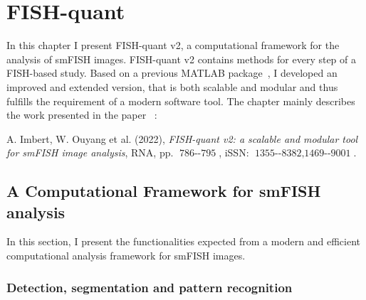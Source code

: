
\graphicspath{{./figures/chapter1/}}

\chapter{FISH-quant}
\label{ch:chapter1}

\minitoc
\newpage

In this chapter I present FISH-quant v2, a computational framework for the analysis of \ac{smFISH} images.
FISH-quant v2 contains methods for every step of a \ac{FISH}-based study.
Based on a previous MATLAB package~\cite{mueller_fish-quant_2013}, I developed an improved and extended version, that is both scalable and modular and thus fulfills the requirement of a modern software tool.
The chapter mainly describes the work presented in the paper~\cite{Imbert_fq_2022} :

\begin{center}
	\color{green}
	A. Imbert, W. Ouyang et al. (2022), \textit{FISH-quant v2: a scalable and modular tool for smFISH image analysis}, RNA, pp. $\operatorname{786--795}$, iSSN: $\operatorname{1355--8382, 1469--9001}$.
\end{center}

\section{A Computational Framework for smFISH analysis}
\label{sec:framework}

In this section, I present the functionalities expected from a modern and efficient computational analysis framework for \ac{smFISH} images. 

\subsection{Detection, segmentation and pattern recognition}
\label{subsec:pipeline_stages}

